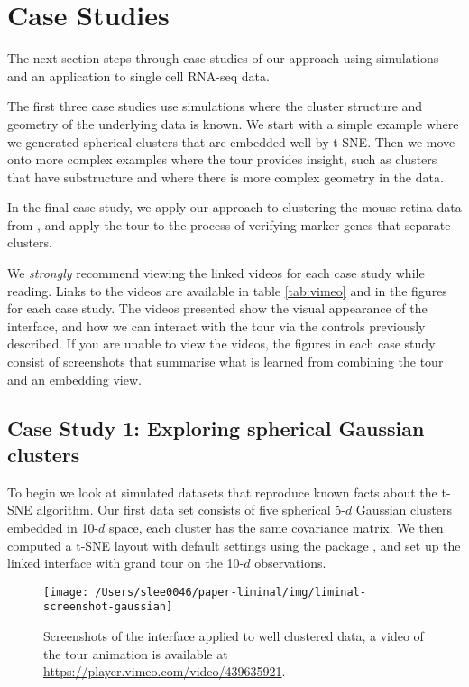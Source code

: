 \documentclass[article,notitle]{jdssv}
\begin{document}
\hypertarget{case-studies}{%
\section{Case Studies}\label{case-studies}}

The next section steps through case studies of our approach using simulations
and an application to single cell RNA-seq data.

The first three case studies use simulations where the cluster structure and
geometry of the underlying data is known. We start with a simple example
where we generated spherical clusters that are embedded well by t-SNE. Then
we move onto more complex examples where the tour provides insight, such
as clusters that have substructure and where there is more complex geometry
in the data.

In the final case study, we apply our approach to clustering
the mouse retina data from \citet{Macosko2015-ot}, and apply the tour
to the process of verifying marker genes that separate clusters.

We \emph{strongly} recommend viewing the linked videos for each case study
while reading. Links to the videos are available in table \ref{tab:vimeo}
and in the figures for each case study. The videos presented show the visual
appearance of the  interface, and how we can interact with the tour
via the controls previously described. If you are unable to view the videos,
the figures in each case study consist of screenshots that summarise what is
learned from combining the tour and an embedding view.

\hypertarget{case-study-1-exploring-spherical-gaussian-clusters}{%
\subsection{Case Study 1: Exploring spherical Gaussian clusters}\label{case-study-1-exploring-spherical-gaussian-clusters}}

To begin we look at simulated datasets that reproduce known facts
about the t-SNE algorithm. Our first data set consists of five spherical 5-\(d\)
Gaussian clusters embedded in 10-\(d\) space, each cluster has the same
covariance matrix. We then computed a t-SNE layout with default settings
using the  package \citep{Rtsne},
and set up the  linked interface with grand tour on the 10-\(d\)
observations.



\begin{figure}

{\centering \texttt{[image: /Users/slee0046/paper-liminal/img/liminal-screenshot-gaussian]} 

}

\caption{Screenshots of the  interface applied to well clustered data, a video of the tour animation is available at \url{https://player.vimeo.com/video/439635921}.}\label{fig:gaussian}
\end{figure}
\end{document}
